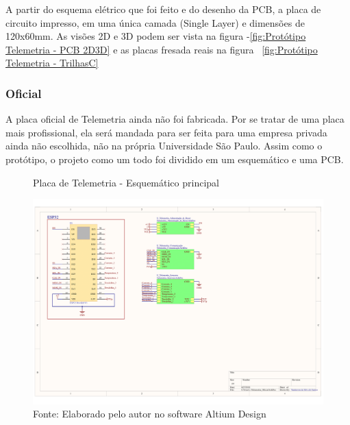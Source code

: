 \documentclass[../delivery_hospital_report.tex]{subfiles}
\begin{document}
A partir do esquema elétrico que foi feito e do desenho da PCB, a placa de circuito impresso, em uma única camada (Single Layer) e dimensões de 120x60mm. As visões 2D e 3D podem ser vista na figura -\ref{fig:Protótipo Telemetria - PCB 2D3D} e as placas fresada reais na figura ~\ref{fig:Protótipo Telemetria - TrilhasC}

\clearpage

\subsubsection{Oficial}

A placa oficial de Telemetria ainda não foi fabricada. Por se tratar de uma placa mais profissional, ela será mandada para ser feita para uma empresa privada ainda não escolhida, não na própria Universidade São Paulo. Assim como o protótipo, o projeto como um todo foi dividido em um esquemático e uma PCB.

\begin{figure}[!h]
\centering
    \caption{Placa de Telemetria - Esquemático principal }
    \centering %
    \includegraphics[width=17cm]{modulos/Telemetria_Oficial-1.png}
    \caption*{Fonte: Elaborado pelo autor no software Altium Design\cite{altium21} }
    \label{Protótipo placa de ## - Esquemático principal}
\end{figure}
\end{document}
